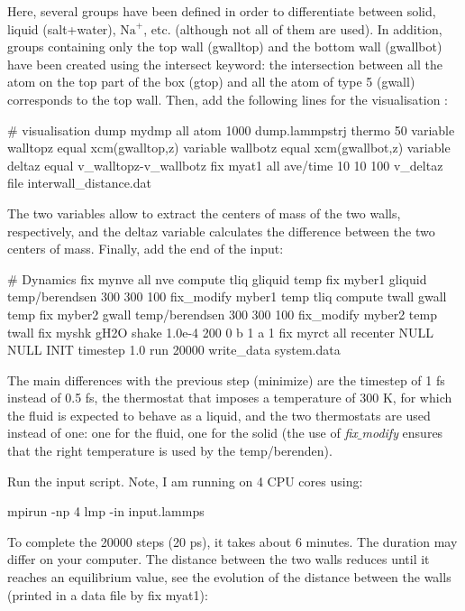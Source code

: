 \noindent Here, several groups have been defined in order to differentiate
between solid, liquid (salt+water), $\text{Na}^+$, etc. (although
not all of them are used). In addition, groups containing only the
top wall (gwalltop) and the bottom wall (gwallbot) have been
created using the intersect keyword: the intersection
between all the atom on the top part of the box (gtop) and
all the atom of type 5 (gwall) corresponds to the top wall.
Then, add the following lines for the visualisation :

\begin{lcverbatim}
# visualisation
dump mydmp all atom 1000 dump.lammpstrj
thermo 50
variable walltopz equal xcm(gwalltop,z)
variable wallbotz equal xcm(gwallbot,z)
variable deltaz equal v_walltopz-v_wallbotz
fix myat1 all ave/time 10 10 100 v_deltaz file interwall_distance.dat
\end{lcverbatim}

\noindent The two variables allow to extract the centers of mass of
the two walls, respectively, and the deltaz variable
calculates the difference between the two centers of mass.
Finally, add the end of the input:

\begin{lcverbatim}
# Dynamics
fix mynve all nve
compute tliq gliquid temp
fix myber1 gliquid temp/berendsen 300 300 100
fix_modify myber1 temp tliq
compute twall gwall temp
fix myber2 gwall temp/berendsen 300 300 100
fix_modify myber2 temp twall
fix myshk gH2O shake 1.0e-4 200 0 b 1 a 1
fix myrct all recenter NULL NULL INIT
timestep 1.0
run 20000
write_data system.data
\end{lcverbatim}

\noindent The main differences with the previous step (minimize) are
the timestep of 1 fs instead of 0.5 fs, the thermostat that imposes a temperature of 300 K, for which the
fluid is expected to behave as a liquid, and the two thermostats are used instead of one:
one for the fluid, one for the solid (the use of \textit{fix$\_$modify} ensures
that the right temperature is used by the temp/berenden).

Run the input script. Note, I am running on 4 CPU cores using:

\begin{lcverbatim}
mpirun -np 4 lmp -in input.lammps
\end{lcverbatim}

\noindent To complete the 20000 steps (20 ps), it takes about 6 minutes. The duration 
may differ on your computer.
The distance between the two walls
reduces until it reaches an equilibrium value, see the evolution
of the distance between the walls (printed in a data file by fix myat1):

